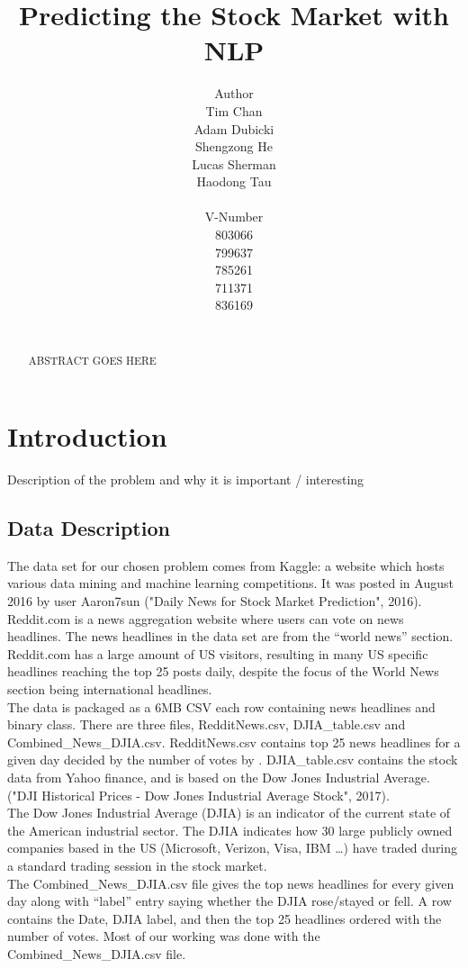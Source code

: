 \documentclass[11pt,a4paper]{article}
\title{Predicting the Stock Market with NLP}
\author{Author \\
  Tim Chan \\
  Adam Dubicki \\
  Shengzong He \\
  Lucas Sherman\\
  Haodong Tau\\
  {\tt} \\\And
  V-Number \\
  803066 \\
  799637 \\
  785261 \\
  711371\\
  836169\\
  {\tt} \\}
\date{}
\begin{document}
\maketitle
\begin{abstract}
    ABSTRACT GOES HERE
\end{abstract}


\section{Introduction}
Description of the problem and why it is important / interesting

\subsection{Data Description}
The data set for our chosen problem comes from Kaggle: a website which hosts various data mining and machine learning competitions. It was posted in August 2016 by user Aaron7sun ("Daily News for Stock Market Prediction", 2016). Reddit.com is a news aggregation website where users can vote on news headlines. The news headlines in the data set are from the “world news” section. Reddit.com has a large amount of US visitors, resulting in many US specific headlines reaching the top 25 posts daily, despite the focus of the World News section being international headlines.\\

The data is packaged as a 6MB CSV each row containing news headlines and binary class. There are three files, RedditNews.csv, DJIA\_table.csv and Combined\_News\_DJIA.csv. RedditNews.csv contains top 25 news headlines for a given day decided by the number of votes by . DJIA\_table.csv contains the stock data from Yahoo finance, and is based on the Dow Jones Industrial Average. ("DJI Historical Prices - Dow Jones Industrial Average Stock", 2017). \\

The Dow Jones Industrial Average (DJIA) is an indicator of the current state of the American industrial sector. The DJIA indicates how 30 large publicly owned companies based in the US (Microsoft, Verizon, Visa, IBM …) have traded during a standard trading session in the stock market.\\

 The Combined\_News\_DJIA.csv file gives the top news headlines for every given day along with “label” entry saying whether the DJIA rose/stayed or fell. A row contains the Date, DJIA label, and then the top 25 headlines ordered with the number of votes. Most of our working was done with the Combined\_News\_DJIA.csv file.\\
\end{document}
